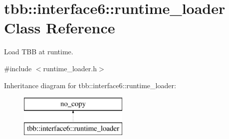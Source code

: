 \hypertarget{classtbb_1_1interface6_1_1runtime__loader}{}\section{tbb\+:\+:interface6\+:\+:runtime\+\_\+loader Class Reference}
\label{classtbb_1_1interface6_1_1runtime__loader}


Load T\+B\+B at runtime.  




{\ttfamily \#include $<$runtime\+\_\+loader.\+h$>$}

Inheritance diagram for tbb\+:\+:interface6\+:\+:runtime\+\_\+loader\+:\begin{figure}[H]
\begin{center}
\leavevmode
\includegraphics[height=2.000000cm]{classtbb_1_1interface6_1_1runtime__loader}
\end{center}
\end{figure}
